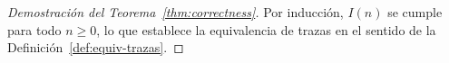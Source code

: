 \documentclass[12pt, a4paper]{article}
\begin{document}
\begin{proof}[Demostración del Teorema~\ref{thm:correctness}]
\medskip
Por inducción, $I(n)$ se cumple para todo $n \geq 0$, lo que establece la equivalencia
de trazas en el sentido de la Definición~\ref{def:equiv-trazas}.
\end{proof}
\end{document}
